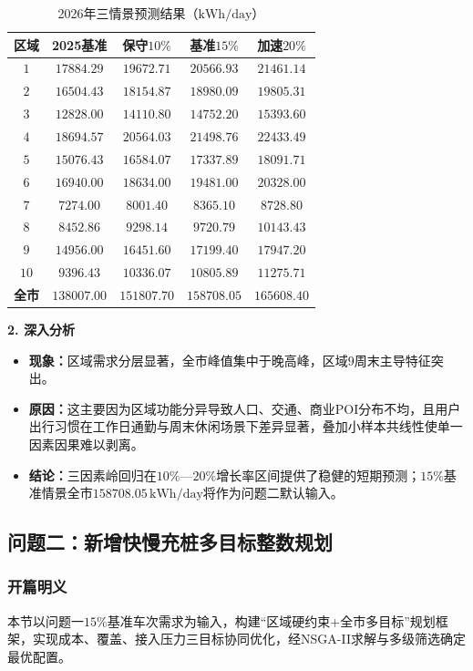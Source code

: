 \documentclass[a4paper,12pt]{ctexart}
\begin{document}
\begin{table}[H]
\centering
\caption{2026年三情景预测结果（$\mathrm{kWh/day}$）}
\begin{tabular}{ccccc}
\toprule
区域 & 2025基准 & 保守$10\%$ & 基准$15\%$ & 加速$20\%$ \\
\midrule
$1$ & $17884.29$ & $19672.71$ & $20566.93$ & $21461.14$ \\
$2$ & $16504.43$ & $18154.87$ & $18980.09$ & $19805.31$ \\
$3$ & $12828.00$ & $14110.80$ & $14752.20$ & $15393.60$ \\
$4$ & $18694.57$ & $20564.03$ & $21498.76$ & $22433.49$ \\
$5$ & $15076.43$ & $16584.07$ & $17337.89$ & $18091.71$ \\
$6$ & $16940.00$ & $18634.00$ & $19481.00$ & $20328.00$ \\
$7$ & $7274.00$ & $8001.40$ & $8365.10$ & $8728.80$ \\
$8$ & $8452.86$ & $9298.14$ & $9720.79$ & $10143.43$ \\
$9$ & $14956.00$ & $16451.60$ & $17199.40$ & $17947.20$ \\
$10$ & $9396.43$ & $10336.07$ & $10805.89$ & $11275.71$ \\
\midrule
\textbf{全市} & $\mathbf{138007.00}$ & $\mathbf{151807.70}$ & $\mathbf{158708.05}$ & $\mathbf{165608.40}$ \\
\bottomrule
\end{tabular}
\end{table}

\textbf{2. 深入分析}
\begin{itemize}
\item \textbf{现象：}区域需求分层显著，全市峰值集中于晚高峰，区域$9$周末主导特征突出。
\item \textbf{原因：}这主要因为区域功能分异导致人口、交通、商业POI分布不均，且用户出行习惯在工作日通勤与周末休闲场景下差异显著，叠加小样本共线性使单一因素因果难以剥离。
\item \textbf{结论：}三因素岭回归在$10\%$—$20\%$增长率区间提供了稳健的短期预测；$15\%$基准情景全市$158708.05\,\mathrm{kWh/day}$将作为问题二默认输入。
\end{itemize}

\subsection{问题二：新增快慢充桩多目标整数规划}

\subsubsection{开篇明义}
本节以问题一$15\%$基准车次需求为输入，构建“区域硬约束+全市多目标”规划框架，实现成本、覆盖、接入压力三目标协同优化，经NSGA-II求解与多级筛选确定最优配置。
\end{document}
